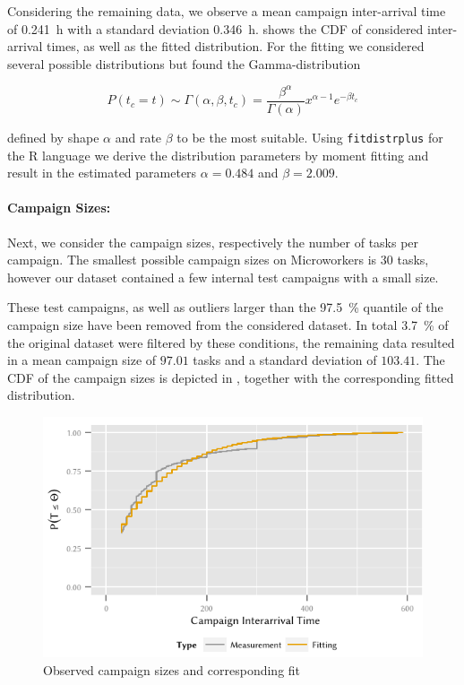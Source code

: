 Considering the remaining data, we observe a mean campaign inter-arrival time of \SI{0.241}{\hour} with a standard deviation \SI{0.346}{\hour}.
 shows the \gls{CDF} of considered inter-arrival times, as well as the fitted distribution.
For the fitting we considered several possible distributions but found the Gamma-distribution 

\[
P(t_c=t) \sim \Gamma(\alpha,\beta,t_c) = \frac{\beta^\alpha}{\Gamma(\alpha)} x^{\alpha-1} e^{-{\beta}t_c}
\]

defined by shape \(\alpha\) and rate \(\beta\) to be the most suitable.
Using \texttt{fitdistrplus} for the R language we derive the distribution parameters by moment fitting and result in the estimated parameters \(\alpha=0.484\) and \(\beta=2.009\).

\paragraph*{Campaign Sizes:}Next, we consider the campaign sizes, respectively the number of tasks per campaign.
The smallest possible campaign sizes on Microworkers is \(30\) tasks, however our dataset contained a few internal test campaigns with a small size.

These test campaigns, as well as outliers larger than the \SI{97.5}{\percent} quantile of the campaign size have been removed from the considered dataset.
In total \SI{3.7}{\percent} of the original dataset were filtered by these conditions, the remaining data resulted in a mean campaign size of \(97.01\) tasks and a standard deviation of \(103.41\).
The CDF of the campaign sizes is depicted in , together with the corresponding fitted distribution.

\begin{figure}
  \centering
  \includegraphics{cloud/crowdsourcing/measurements/figures/campaign_sizes}
  \caption{Observed campaign sizes \campaignSize and corresponding fit}
  \label{fig:cloud:crowdsourcing:measurements:parameters:campaign_sizes}
\end{figure}

